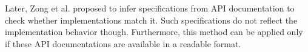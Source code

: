 Later, Zong et al. \cite{ZhongZXM11} proposed to infer
specifications from API documentation to check whether
implementations match it.  Such specifications do not reflect the
implementation behavior though. Furthermore, this method can be
applied only if these API documentations are available in a
readable format.
